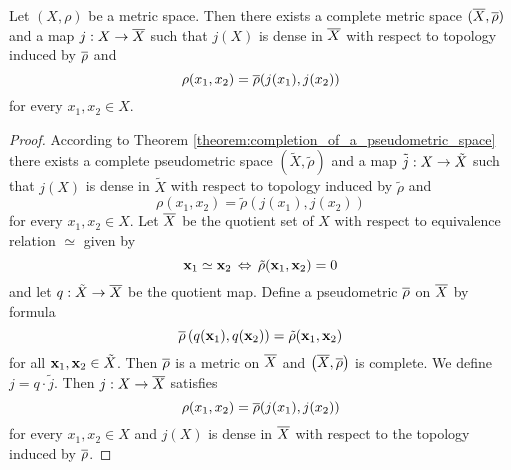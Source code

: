 \begin{corollary}\label{corollary:completion_of_metric_spaces}
Let $(X,\rho)$ be a metric space. Then there exists a complete metric space $(\overline{X},\overline{\rho})$ and a map $j:X\rightarrow \overline{X}$ such that $j(X)$ is dense in $\overline{X}$ with respect to topology induced by $\overline{\rho}$ and
$$\rho(x_1,x_2) = \overline{\rho}(j(x_1),j(x_2))$$
for every $x_1,x_2\in X$.
\end{corollary}
\begin{proof}
According to Theorem \ref{theorem:completion_of_a_pseudometric_space} there exists a complete pseudometric space $\left(\tilde{X},\tilde{\rho}\right)$ and a map $\tilde{j}:X\rightarrow \tilde{X}$ such that $j(X)$ is dense in $\tilde{X}$ with respect to topology induced by $\tilde{\rho}$ and
$$\rho(x_1,x_2) = \tilde{\rho}(j(x_1),j(x_2))$$
for every $x_1,x_2\in X$. Let $\overline{X}$ be the quotient set of $X$ with respect to equivalence relation $\simeq$ given by 
$$\mathbf{x}_1\simeq \mathbf{x}_2\,\Leftrightarrow\,\tilde{\rho}(\mathbf{x}_1,\mathbf{x}_2) = 0$$
and let $q:\tilde{X}\rightarrow \overline{X}$ be the quotient map. Define a pseudometric $\overline{\rho}$ on $\overline{X}$ by formula
$$\overline{\rho}\left(q(\mathbf{x}_1),q(\mathbf{x}_2)\right) = \tilde{\rho}(\mathbf{x}_1,\mathbf{x}_2)$$
for all $\mathbf{x}_1,\mathbf{x}_2\in \tilde{X}$. Then $\overline{\rho}$ is a metric on $\overline{X}$ and $\left(\overline{X},\overline{\rho}\right)$ is complete. We define $j = q\cdot \tilde{j}$. Then $j:X\rightarrow \overline{X}$ satisfies$$\rho(x_1,x_2) = \overline{\rho}(j(x_1),j(x_2))$$
for every $x_1,x_2\in X$ and $j(X)$ is dense in $\overline{X}$ with respect to the topology induced by $\overline{\rho}$.
\end{proof}






































\small



